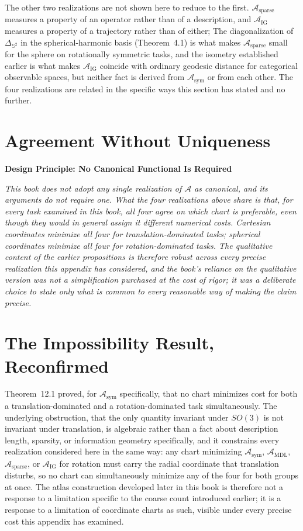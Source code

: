 \documentclass[11pt,fleqn]{book}
\numberwithin{equation}{chapter}
\newenvironment{principle}[1]
  {\begin{principleEnv}
   \noindent\textbf{Design Principle: #1}\par\smallskip\itshape}
  {\end{principleEnv}}
\theoremstyle{plain}
\theoremstyle{definition}
\theoremstyle{remark}
\newcommand{\Sphere}{\mathbb{S}^{2}}
\begin{document}
The other two realizations are not shown here to reduce to the first. \(\mathcal A_{\mathrm{sparse}}\) measures a property of an operator rather than of a description, and \(\mathcal A_{\mathrm{IG}}\) measures a property of a trajectory rather than of either; The diagonalization of \(\Delta_{\Sphere}\) in the spherical-harmonic basis (Theorem~4.1) is what makes \(\mathcal A_{\mathrm{sparse}}\) small for the sphere on rotationally symmetric tasks, and the isometry established earlier is what makes \(\mathcal A_{\mathrm{IG}}\) coincide with ordinary geodesic distance for categorical observable spaces, but neither fact is derived from \(\mathcal A_{\mathrm{sym}}\) or from each other. The four realizations are related in the specific ways this section has stated and no further.

\section{Agreement Without Uniqueness}

\begin{principle}{No Canonical Functional Is Required}
This book does not adopt any single realization of \(\mathcal A\) as canonical, and its arguments do not require one. What the four realizations above share is that, for every task examined in this book, all four agree on which chart is preferable, even though they would in general assign it different numerical costs. Cartesian coordinates minimize all four for translation-dominated tasks; spherical coordinates minimize all four for rotation-dominated tasks. The qualitative content of the earlier propositions is therefore robust across every precise realization this appendix has considered, and the book's reliance on the qualitative version was not a simplification purchased at the cost of rigor; it was a deliberate choice to state only what is common to every reasonable way of making the claim precise.
\end{principle}

\section{The Impossibility Result, Reconfirmed}

Theorem~12.1 proved, for \(\mathcal A_{\mathrm{sym}}\) specifically, that no chart minimizes cost for both a translation-dominated and a rotation-dominated task simultaneously. The underlying obstruction, that the only quantity invariant under \(SO(3)\) is not invariant under translation, is algebraic rather than a fact about description length, sparsity, or information geometry specifically, and it constrains every realization considered here in the same way: any chart minimizing \(\mathcal A_{\mathrm{sym}}\), \(\mathcal A_{\mathrm{MDL}}\), \(\mathcal A_{\mathrm{sparse}}\), or \(\mathcal A_{\mathrm{IG}}\) for rotation must carry the radial coordinate that translation disturbs, so no chart can simultaneously minimize any of the four for both groups at once. The atlas construction developed later in this book is therefore not a response to a limitation specific to the coarse count introduced earlier; it is a response to a limitation of coordinate charts as such, visible under every precise cost this appendix has examined.
\end{document}
